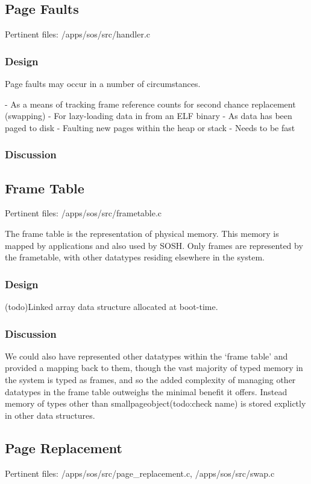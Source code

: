\documentclass[a4paper,12pt]{article}
\begin{document}
\subsection{Page Faults}
Pertinent files: /apps/sos/src/handler.c

\subsubsection{Design}
Page faults may occur in a number of circumstances.

- As a means of tracking frame reference counts for second chance replacement (swapping)
- For lazy-loading data in from an ELF binary
- As data has been paged to disk
- Faulting new pages within the heap or stack
- Needs to be fast
\subsubsection{Discussion}


\subsection{Frame Table}
Pertinent files: /apps/sos/src/frametable.c

The frame table is the representation of physical memory. This memory is
mapped by applications and also used by SOSH.  Only frames are represented by
the frametable, with other datatypes residing elsewhere in the system.
\subsubsection{Design}
(todo)Linked array data structure allocated at boot-time.

\subsubsection{Discussion}
We could also have represented other datatypes within the `frame table' and
provided a mapping back to them, though the vast majority of typed memory in
the system is typed as frames, and so the added complexity of managing other
datatypes in the frame table outweighs the minimal benefit it offers.  Instead
memory of types other than smallpageobject(todo:check name) is stored
explictly in other data structures.

\subsection{Page Replacement}
Pertinent files: /apps/sos/src/page\_replacement.c, /apps/sos/src/swap.c
\end{document}
